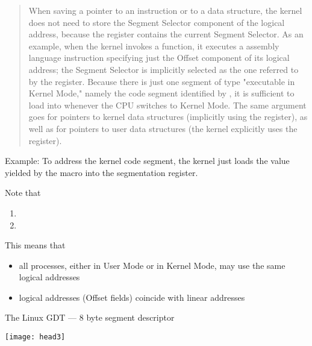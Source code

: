 \begin{itemize}
\begin{quote}
    When saving a pointer to an instruction or to a data structure, the kernel does not
    need to store the Segment Selector component of the logical address, because the
     register contains the current Segment Selector. As an example, when the
    kernel invokes a function, it executes a  assembly language instruction
    specifying just the Offset component of its logical address; the Segment Selector is
    implicitly selected as the one referred to by the  register. Because there is
    just one segment of type "executable in Kernel Mode," namely the code segment
    identified by , it is sufficient to load 
    into  whenever the CPU switches to Kernel Mode. The same argument goes for
    pointers to kernel data structures (implicitly using the  register), as well
    as for pointers to user data structures (the kernel explicitly uses the 
    register).
  \end{quote}
\end{itemize}

\begin{frame}
  \begin{block}{Example:}
    To address the kernel code segment, the kernel just loads the value yielded by the
    {} macro into the {} segmentation register.
  \end{block}
  \begin{block}{Note that}
    \begin{enumerate}
    \item {}
    \item {}
    \end{enumerate}
    This means that
    \begin{itemize}
    \item all processes, either in User Mode or in Kernel Mode, may use the same
      logical addresses
    \item logical addresses (Offset fields) coincide with linear addresses
    \end{itemize}
  \end{block}
\end{frame}
  
\begin{frame}{The Linux GDT}{ --- 8 byte segment descriptor}
  \begin{center}
     
  \end{center}
  \begin{block}{}
    \begin{center}
      \texttt{[image: head3]}
    \end{center}
  \end{block}
\end{frame}

